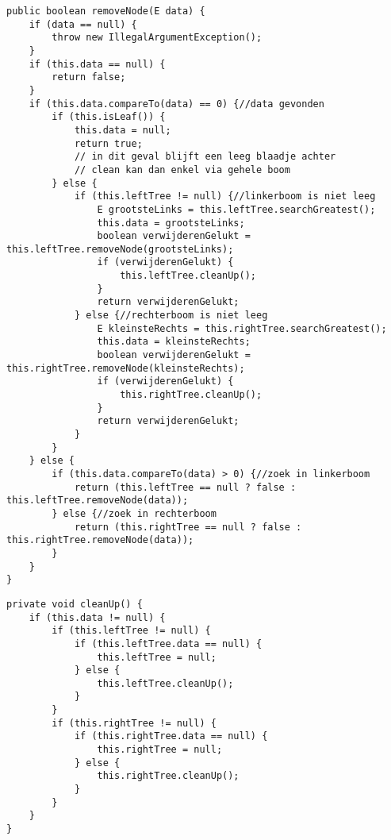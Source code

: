 \begin{Oplossing}{3.8}
\begin{lstlisting}[caption={removeNode methode}, label=bstremovenode]
public boolean removeNode(E data) {
	if (data == null) {
		throw new IllegalArgumentException();
	}
	if (this.data == null) {
		return false;
	}
	if (this.data.compareTo(data) == 0) {//data gevonden
		if (this.isLeaf()) {
			this.data = null;
			return true;
			// in dit geval blijft een leeg blaadje achter
			// clean kan dan enkel via gehele boom
		} else {
			if (this.leftTree != null) {//linkerboom is niet leeg
				E grootsteLinks = this.leftTree.searchGreatest();
				this.data = grootsteLinks;
				boolean verwijderenGelukt = this.leftTree.removeNode(grootsteLinks);
				if (verwijderenGelukt) {
					this.leftTree.cleanUp();
				}
				return verwijderenGelukt;
			} else {//rechterboom is niet leeg
				E kleinsteRechts = this.rightTree.searchGreatest();
				this.data = kleinsteRechts;
				boolean verwijderenGelukt = this.rightTree.removeNode(kleinsteRechts);
				if (verwijderenGelukt) {
					this.rightTree.cleanUp();
				}
				return verwijderenGelukt;
			}
		}
	} else {
		if (this.data.compareTo(data) > 0) {//zoek in linkerboom
			return (this.leftTree == null ? false : this.leftTree.removeNode(data));
		} else {//zoek in rechterboom
			return (this.rightTree == null ? false : this.rightTree.removeNode(data));
		}
	}
}
\end{lstlisting}

\end{Oplossing}
\begin{Oplossing}{3.9}
\begin{lstlisting}[caption={ruimOp methode}, label=bstruimop]
private void cleanUp() {
	if (this.data != null) {
		if (this.leftTree != null) {
			if (this.leftTree.data == null) {
				this.leftTree = null;
			} else {
				this.leftTree.cleanUp();
			}
		}
		if (this.rightTree != null) {
			if (this.rightTree.data == null) {
				this.rightTree = null;
			} else {
				this.rightTree.cleanUp();
			}
		}
	}
}
\end{lstlisting}
\end{Oplossing}
